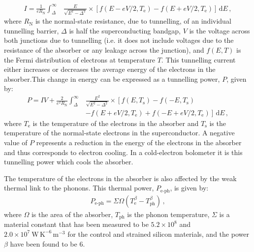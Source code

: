 \documentclass[final]{svjour2}
\begin{document}
\begin{align}
I = \frac{1}{eR_{\mathrm{N}}}\int^{\infty}_{\varDelta} 
	&\frac{E}{\sqrt{E^{2}-\varDelta^{2}}} \times 
	\left[f\left(\!E-eV/2,T_{\mathrm{e}}\right) - f\left(\!E+eV/2,T_{\mathrm{e}}\right)\right]\,\mathrm{d}E\,,
	\label{eqn:IV}
\end{align}
where $R_{\mathrm{N}}$ is the normal-state resistance, due to tunnelling, of an individual tunnelling barrier, $\varDelta$ is half the superconducting bandgap, $V$ is the voltage across both junctions due to tunnelling (i.e. it does not include voltages due to the resistance of the absorber or any leakage across the junction), and $f\!\left(E,T\right)$ is the Fermi distribution of electrons at temperature $T$. This tunnelling current either increases or decreases the average energy of the electrons in the absorber.This change in energy can be expressed as a tunnelling power, $P$, given by:
\begin{align}
P = IV +\frac{2}{e^{2}R_{\mathrm{N}}}\int^{\infty}_{\varDelta}&\frac{E^{2}}
	{\sqrt{E^{2}-\varDelta^{2}}} \times 
		\left[f\!\left(E,T_{\mathrm{s}}\right)
	- f\!\left(-E,T_{\mathrm{s}}\right)\right.\nonumber \\
	&\left.- f\!\left(E+eV/2,T_{\mathrm{e}}\right)+
		f\!\left(-E+eV/2,T_{\mathrm{e}}\right)\right]\,\mathrm{d}E\,,
	\label{eqn:Ptun}
\end{align}
where $T_{\mathrm{e}}$ is the temperature of the electrons in the absorber and  $T_{\mathrm{s}}$ is the temperature of the normal-state electrons in the superconductor. A negative value of $P$ represents a reduction in the energy of the electrons in the absorber and thus corresponds to electron cooling. In a cold-electron bolometer it is this tunnelling power which cools the absorber. %
\par 
The temperature of the electrons in the absorber is also affected by the weak thermal link to the phonons. This thermal power, $P_{\mathrm{e\mbox{-}ph}}$, is given by:
\begin{align}
P_{\mathrm{e\mbox{-}ph}} = \varSigma\varOmega\left(T^{\beta}_{\mathrm{e}} - 
		T^{\beta}_{\mathrm{ph}}\right)\,, \label{eqn:Pe-ph}
\end{align}
where $\varOmega$ is the area of the absorber, $T_{\mathrm{ph}}$ is the phonon temperature, $\varSigma$ is a material constant that has been measured to be $5.2 \times 10^{8}$ and $2.0 \times 10^{7}~\mathrm{W\,K^{-6}\,m^{-3}}$ for the control and strained silicon materials,\cite{Prest2011} and the power $\beta$ have been found\cite{Prest2011} to be $6$.
\end{document}
